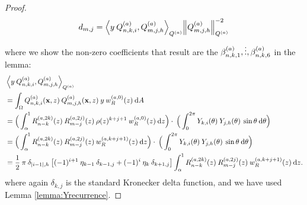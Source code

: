 \documentclass[11pt, oneside]{article}   	%
\begin{document}
\begin{proof}
\begin{align*}
	d_{m,j} = {\ip< y \: \scopnkia, \scopmjha >_{\scopa}}{\norm{\scopmjha}^{-2}_{\scopa}}
\end{align*}
where we show the non-zero coefficients that result are the $\beta^{(a)}_{n,k,1},\vdots,\beta^{(a)}_{n,k,6}$ in the lemma:
\begin{align*}
	&\ip<y \: \scopnkia, \scopmjha>_{\scopa} \\
	&= \int_\Omega \scopnkia(\xvec,z) \: \scopmjha(\xvec,z) \: y \: \genjacw^{(a,0)}(z) \: \D A \\
	&= \Big( \int^1_\alpha \genjacnmk^{(a, 2k)}(z) \: \genjacmmj^{(a, 2j)}(z) \: \rho(z)^{k+j+1} \: \genjacw^{(a, 0)}(z) \: \D z \Big) \cdot \: \Big( \int_0^{2\pi} \chki(\theta) \: \chjh(\theta) \: \sin\theta \: \D \theta \Big) \\
	&= \Big( \int^1_\alpha \genjacnmk^{(a, 2k)}(z) \: \genjacmmj^{(a, 2j)}(z) \: \genjacw^{(a, k + j + 1)}(z) \: \D z \Big) \cdot \: \Big( \int_0^{2\pi} \chki(\theta) \: \chjh(\theta) \: \sin\theta \: \D \theta \Big) \\
	&= \half \: \pi \: \delta_{|i-1|,h} \: \big[(-1)^{i+1} \: \eta_{k-1} \: \delta_{k-1, j} + (-1)^i \: \eta_{k} \: \delta_{k+1, j}\big] \int^1_\alpha \genjacnmk^{(a, 2k)}(z) \: \genjacmmj^{(a, 2j)}(z) \: \genjacw^{(a, k + j + 1)}(z) \: \D z.
\end{align*}
where again $\delta_{k, j}$ is the standard Kronecker delta function, and we have used Lemma \ref{lemma:Yrecurrence}.

\end{proof}
\end{document}
